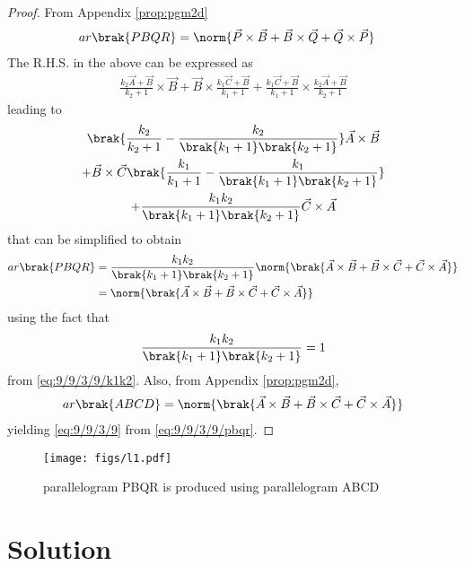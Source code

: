 \documentclass[journal,10pt,twocolumn]{article}
\begin{document}
\begin{proof}
From Appendix
  \ref{prop:pgm2d}
\begin{align}
	ar\brak{PBQR} &= \norm{\vec{P} \times \vec{B}+\vec{B} \times \vec{Q}+\vec{Q} \times \vec{P}}
		\label{eq:9/9/3/9/arpbqr}
  \end{align}
  The R.H.S. in the above can be expressed as
\begin{align}
\frac{k_2\vec{A}+ \vec{B}}{k_2+1} \times \vec{B}+\vec{B} \times \frac{k_1\vec{C}+ \vec{B}}{k_1+1}+\frac{k_1\vec{C}+ \vec{B}}{k_1+1} \times \frac{k_2\vec{A}+ \vec{B}}{k_2+1}
  \end{align}
  leading to 
  \begin{multline}
	  \brak{\frac{k_2}{k_2+1}-\frac{k_2}{\brak{k_1+1}\brak{k_2+1}}} \vec{A}\times \vec{B}
	  \\
	  +\vec{B} \times\vec{C}\brak{ \frac{k_1}{k_1+1}-\frac{k_1}{\brak{k_1+1}\brak{k_2+1}}}
	  \\
	  +\frac{k_1k_2}{\brak{k_1+1}\brak{k_2+1}}\vec{C} \times \vec{A}
  \end{multline}
  that can be simplified to obtain
\begin{align}
	ar\brak{PBQR} 
	  &=
	  \frac{k_1k_2}{\brak{k_1+1}\brak{k_2+1}}\norm{\brak{\vec{A} \times \vec{B}+\vec{B} \times \vec{C}+\vec{C} \times \vec{A}}}
	  \\
	  &=\norm{\brak{\vec{A} \times \vec{B}+\vec{B} \times \vec{C}+\vec{C} \times \vec{A}}}
		\label{eq:9/9/3/9/pbqr}
\end{align}
  using the fact that 
  \begin{align}
\frac{k_1k_2}{\brak{k_1+1}\brak{k_2+1}} = 1
  \end{align}
  from 
		\eqref{eq:9/9/3/9/k1k2}.  Also, from 
Appendix
  \ref{prop:pgm2d},
  \begin{align}
ar\brak{ABCD} = \norm{\brak{\vec{A} \times \vec{B}+\vec{B} \times \vec{C}+\vec{C} \times \vec{A}}}
		\label{eq:9/9/3/9/abcd}
  \end{align}
  yielding
		\eqref{eq:9/9/3/9} from 
		\eqref{eq:9/9/3/9/pbqr}.
	\end{proof}
\iffalse

\begin{figure}[H]
\centering
\texttt{[image: figs/l1.pdf]}
\caption{parallelogram PBQR is produced using parallelogram ABCD}
\end{figure}

\section*{Solution}
\end{document}
